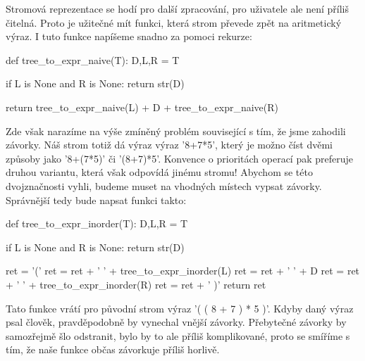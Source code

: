 Stromová reprezentace se hodí pro další zpracování, pro uživatele ale není
příliš čitelná. Proto je užitečné mít funkci, která strom převede zpět na
aritmetický výraz. I tuto funkce napíšeme snadno za pomoci rekurze:

\begin{python}
def tree_to_expr_naive(T):
    D,L,R = T

    if L is None and R is None:
        return str(D)

    return tree_to_expr_naive(L) + D + tree_to_expr_naive(R)
\end{python}

Zde však narazíme na výše zmíněný problém související s tím, že jsme zahodili
závorky. Náš strom totiž dá výraz výraz '8+7*5', který je možno číst dvěmi
způsoby jako '8+(7*5)' či '(8+7)*5'. Konvence o prioritách operací pak preferuje
druhou variantu, která však odpovídá jinému stromu! Abychom se této dvojznačnosti
vyhli, budeme muset na vhodných místech vypsat závorky. Správnější tedy
bude napsat funkci takto:

\begin{python}
def tree_to_expr_inorder(T):
    D,L,R = T

    if L is None and R is None:
        return str(D)

    ret = '('
    ret = ret + ' ' + tree_to_expr_inorder(L)
    ret = ret + ' ' + D
    ret = ret + ' ' + tree_to_expr_inorder(R)
    ret = ret + ' )'
    return ret
\end{python}

Tato funkce vrátí pro původní strom výraz '( ( 8 + 7 ) * 5 )'. Kdyby daný výraz psal
člověk, pravděpodobně by vynechal vnější závorky. Přebytečné závorky by samozřejmě
šlo odstranit, bylo by to ale příliš komplikované, proto se smíříme s tím, že
naše funkce občas závorkuje příliš horlivě.

